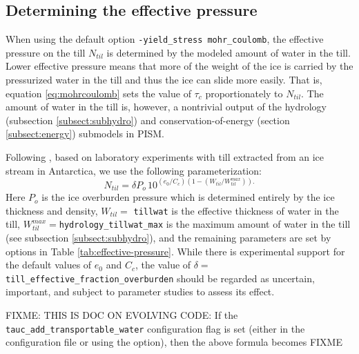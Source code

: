 \subsection*{Determining the effective pressure}  When using the default option \texttt{-yield_stress mohr_coulomb}, the effective pressure on the till $N_{til}$ is determined by the modeled amount of water in the till.  Lower effective pressure means that more of the weight of the ice is carried by the pressurized water in the till and thus the ice can slide more easily.  That is, equation \eqref{eq:mohrcoulomb} sets the value of $\tau_c$ proportionately to $N_{til}$.  The amount of water in the till is, however, a nontrivial output of the hydrology (subsection \ref{subsect:subhydro}) and conservation-of-energy (section \ref{subsect:energy}) submodels in PISM.

Following \cite{Tulaczyketal2000}, based on laboratory experiments with till extracted from an ice stream in Antarctica, we use the following parameterization:
\begin{equation}
N_{til} = \delta P_o \, 10^{(e_0/C_c) \left(1 - (W_{til}/W_{til}^{max})\right).}  \label{eq:computeNtil}
\end{equation}
Here $P_o$ is the ice overburden pressure which is determined entirely by the ice thickness and density, $W_{til}=$ \texttt{tillwat} is the effective thickness of water in the till, $W_{til}^{max}=$\texttt{hydrology_tillwat_max} is the maximum amount of water in the till (see subsection \ref{subsect:subhydro}), and the remaining parameters are set by options in Table \ref{tab:effective-pressure}.  While there is experimental support for the default values of $e_0$ and $C_c$, the value of $\delta=$\texttt{till_effective_fraction_overburden} should be regarded as uncertain, important, and subject to parameter studies to assess its effect.

FIXME:  THIS IS DOC ON EVOLVING CODE:  If the \texttt{tauc_add_transportable_water} configuration flag is set (either in the configuration file or using the  option), then the above formula becomes FIXME

